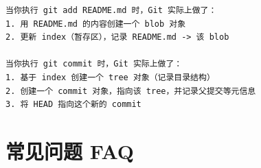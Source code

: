 \documentclass[12pt,a4paper]{article}
\begin{document}
\begin{lstlisting}[numbers=none]
当你执行 git add README.md 时，Git 实际上做了：
1. 用 README.md 的内容创建一个 blob 对象
2. 更新 index（暂存区），记录 README.md -> 该 blob

当你执行 git commit 时，Git 实际上做了：
1. 基于 index 创建一个 tree 对象（记录目录结构）
2. 创建一个 commit 对象，指向该 tree，并记录父提交等元信息
3. 将 HEAD 指向这个新的 commit
\end{lstlisting}

\section{常见问题 FAQ}
\end{document}

